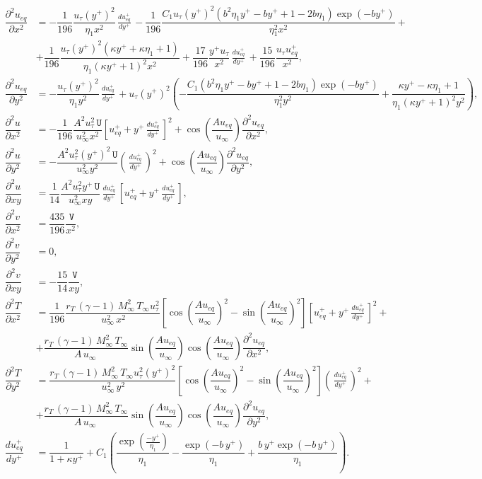 \documentclass[10pt]{article}
\newcommand{\diff}[2] {\dfrac{\partial #1}{\partial #2}}
\newcommand{\U}{\,\mathtt{U}}
\newcommand{\V}{\,\mathtt{V}}
\newcommand{\Dueqplusyplus}{\, \frac{du_{eq}^+}{dy^+}\,}
\begin{document}
\begin{equation}\label{eq:aux_2d_02}
\begin{split}
%
\diff{^2u_{eq}}{x^2} &= -\dfrac{1}{196} \dfrac{ u_{\tau} (y^{+})^2 }{\eta_1 x^2}\Dueqplusyplus - \dfrac{1}{196} \dfrac{C_1 u_{\tau}(y^{+})^2 (b^2 \eta_1 y^{+}-b y^{+}+1-2 b \eta_1)  \exp(-b y^{+})}{\eta_1^2 x^2}+\\
  &+\dfrac{1}{196} \dfrac{ u_{\tau}(y^{+})^2 (\kappa y^{+}+\kappa \eta_1+1)}{\eta_1 (\kappa y^{+}+1)^2 x^2}+\dfrac{17}{196}\dfrac{ y^{+} u_{\tau} }{x^2}\Dueqplusyplus+\dfrac{15}{196} \dfrac{u_{\tau} u_{eq}^{+}}{x^2}, \\  
%
\diff{^2u_{eq}}{y^2} &= -\dfrac{ u_{\tau} (y^{+})^2 }{\eta_1 y^2 } \Dueqplusyplus+ u_{\tau} (y^{+})^2  \left(-\dfrac{ C_1(b^2 \eta_1 y^{+}-b y^{+}+1-2 b \eta_1) \exp(-b y^{+}) }{\eta_1^2 y^2 }+\dfrac{\kappa y^{+} -\kappa \eta_1+1}{\eta_1 (\kappa y^{+}+1)^2 y^2}\right), \\  
%
\diff{^2u}{x^2}&= -\dfrac{1}{196} \dfrac{A^2 u_{\tau}^2 \U }{u_{\infty}^2 x^2}\left[u_{eq}^{+}+y^{+} \Dueqplusyplus\right]^2+\cos\left(\dfrac{A u_{eq}}{u_{\infty}}\right) \diff{^2u_{eq}}{x^2}, \\ 
%
\diff{^2u}{y^2} &= -\dfrac{ A^2  u_{\tau}^2 (y^{+})^2 \U}{u_{\infty}^2 y^2}\left(\Dueqplusyplus\right)^2 + \cos\left(\dfrac{A u_{eq}}{u_{\infty}}\right)\diff{^2u_{eq}}{y^2} , \\  
%
\diff{^2u}{xy} &= \dfrac{1}{14}\dfrac{ A^2 u_{\tau}^2 y^{+}  \U}{u_{\infty}^2 x y}\Dueqplusyplus \left[u_{eq}^{+}+y^{+} \Dueqplusyplus\right], \\  
%
\diff{^2v}{x^2} &= \dfrac{435}{196} \dfrac{\V}{x^2} ,\\
%
\diff{^2v}{y^2} &= 0, \\  
%
\diff{^2v}{xy} &= -\dfrac{15}{14} \dfrac{\V}{xy},\\  
%
\diff{^2T}{x^2} &= \dfrac{1}{196}\dfrac{ r_T \, (\gamma-1) \, M_{\infty}^2 \, T_{\infty}  u_{\tau}^2}{ \, u_{\infty}^2 \, x^2} \left[\cos\left(\dfrac{A u_{eq}}{u_{\infty}}\right)^2 -\sin\left(\dfrac{A u_{eq}}{u_{\infty}}\right)^2 \right] \left[u_{eq}^{+}+y^{+} \Dueqplusyplus\right]^2 +\\
& +\dfrac{r_T \, (\gamma-1) \, M_{\infty}^2 \, T_{\infty}    }{A \, u_{\infty} \,} \sin\left(\dfrac{A u_{eq}}{u_{\infty}}\right) \cos\left(\dfrac{A u_{eq}}{u_{\infty}}\right)\diff{^2u_{eq}}{x^2}, \\  
%
\diff{^2T}{y^2}  &= \dfrac{r_T \, (\gamma-1) \, M_{\infty}^2 \, T_{\infty} u_{\tau}^2 (y^{+})^2 }{\, u_{\infty}^2 \, y^2} \left[\cos\left(\dfrac{A u_{eq}}{u_{\infty}}\right)^2  - \sin\left(\dfrac{A u_{eq}}{u_{\infty}}\right)^2 \right]\left(\Dueqplusyplus\right)^2+ \\ 
&+\dfrac{r_T \, (\gamma-1) \, M_{\infty}^2 \, T_{\infty} }{A \, u_{\infty} \,}	\sin\left(\dfrac{A u_{eq}}{u_{\infty}}\right) \cos\left(\dfrac{A u_{eq}}{u_{\infty}}\right) \diff{^2u_{eq}}{y^2}, \\
%
 \dfrac{d u_{eq}^+}{d y^+} &= \dfrac{1}{1 + \kappa  y^{+}} + C_1  \left( \dfrac{\exp(\frac{-y^{+}}{\eta_1})}{\eta_1} - \dfrac{\exp(- b\,y^{+} )}{\eta_1} + \dfrac{ b  \, y^{+}  \exp(- b\, y^{+} )}{\eta_1}\right).
\end{split}
\end{equation}
\end{document}
